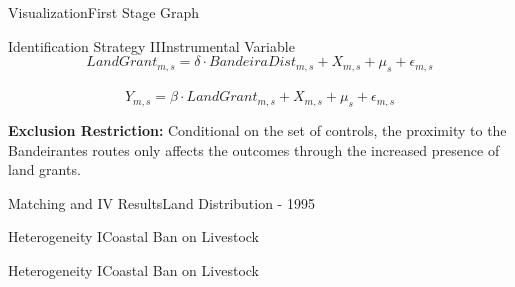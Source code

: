 \documentclass[aspectratio=1610]{beamer}
\begin{document}
\begin{frame}{Visualization}{First Stage Graph}
    \begin{figure}[h!]
        \begin{center}
        \end{center}
      \end{figure}
\end{frame}

\begin{frame}{Identification Strategy II}{Instrumental Variable}
    \begin{equation}
        \label{eqn:firststage}
        LandGrant_{m,s} = \delta \cdot BandeiraDist_{m,s} +  X_{m,s} + \mu_s  + \epsilon_{m,s}
      \end{equation}

      \begin{equation}
        \label{eqn:ivequation}
        Y_{m,s} = \beta \cdot \widehat{LandGrant}_{m,s} + X_{m,s} + \mu_s +  \epsilon_{m,s}
      \end{equation}

    \vspace{2mm}
      
    \begin{outline}
        \1 \textbf{Exclusion Restriction:} Conditional on the set of controls, the proximity to the Bandeirantes routes only affects the outcomes through the increased presence of land grants.
    \end{outline}
\end{frame}

\begin{frame}{Matching and IV Results}{Land Distribution - 1995}
    \footnotesize
    
\end{frame}

\begin{frame}{Heterogeneity I}{Coastal Ban on Livestock}
    \tiny
    
\end{frame}

\begin{frame}{Heterogeneity I}{Coastal Ban on Livestock}
    \tiny
    
\end{frame}
\end{document}
